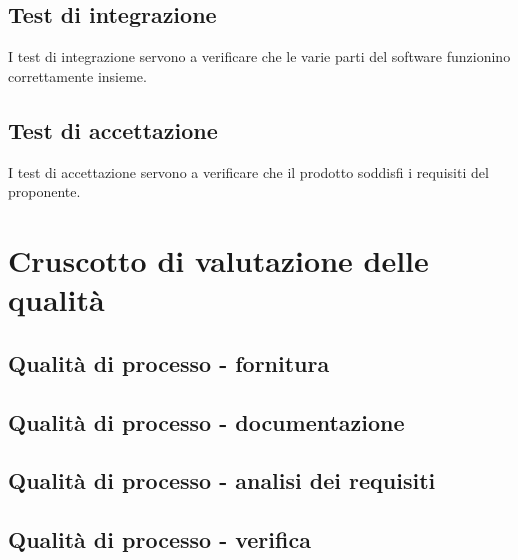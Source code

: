 \documentclass[11pt]{article}
\begin{document}
\begin{justify}
\subsection{Test di integrazione}
I test di integrazione servono a verificare che le varie parti del software funzionino correttamente insieme.\\
\subsection{Test di accettazione}
I test di accettazione servono a verificare che il prodotto soddisfi i requisiti del proponente.\\


\section{Cruscotto di valutazione delle qualità}
\subsection{Qualità di processo - fornitura}
\subsection{Qualità di processo - documentazione}
\subsection{Qualità di processo - analisi dei requisiti}
\subsection{Qualità di processo - verifica}

\end{justify}
\end{document}
